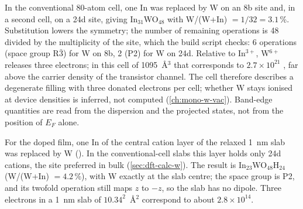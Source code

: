 In the conventional 80-atom cell, one In was replaced by W on an 8b site and, in a second cell, on a 24d site, giving
In$_{31}$WO$_{48}$ with W/(W+In) $= 1/32 = 3.1$\,\%. Substitution lowers the symmetry; the number of remaining operations
is 48 divided by the multiplicity of the site, which the build script checks: 6 operations (space group R$\bar{3}$) for
W on 8b, 2 (P2) for W on 24d. Relative to In$^{3+}$, W$^{6+}$ releases three electrons; in this cell of 1095~\AA$^3$
that corresponds to $2.7\times10^{21}$\cmcu{} , far above the carrier density of the transistor channel. The
cell therefore describes a degenerate filling with three donated electrons per cell; whether W stays ionised at device
densities is inferred, not computed (\cref{ch:mono-w-vac}). Band-edge quantities are read from the dispersion and the
projected states, not from the position of $E_F$ alone.

For the doped film, one In of the central cation layer of the relaxed 1~nm slab was replaced by W
(). In the conventional-cell slabs this layer holds only 24d cations, the site preferred in
bulk (\cref{sec:dft-calc-w}). The result is In$_{23}$WO$_{48}$H$_{24}$ (W/(W+In) $= 4.2$\,\%), with W exactly at the slab
centre; the space group is P2, and its twofold operation still maps $z$ to $-z$, so the slab has no dipole. Three
electrons in a 1~nm slab of $10.34^2$~\AA$^2$ correspond to about $2.8\times10^{14}$\cmsq.

